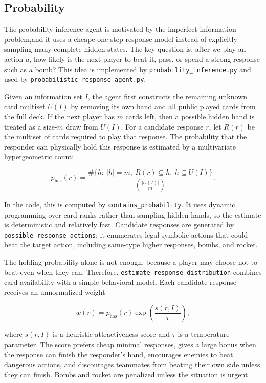 
\subsection{Probability}

The probability inference agent is motivated by the imperfect-information
problem,and it uses a cheape one-step response model instead of explicitly sampling many complete hidden states.
The key question is:
after we play an action \(a\), how likely is the next player to beat it, pass, or
spend a strong response such as a bomb? This idea is implemented by
\texttt{probability\_inference.py} and used by
\texttt{probabilistic\_response\_agent.py}.

Given an information set \(I\), the agent first constructs the remaining unknown
card multiset \(U(I)\) by removing its own hand and all public played cards from
the full deck. If the next player has \(m\) cards left, then a possible hidden
hand is treated as a size-\(m\) draw from \(U(I)\). For a candidate response
\(r\), let \(R(r)\) be the multiset of cards required to play that response. The
probability that the responder can physically hold this response is estimated by
a multivariate hypergeometric count:

\[
    p_{\mathrm{has}}(r)
    =
    \frac{
        \#\{h:\ |h|=m,\ R(r)\subseteq h,\ h\subseteq U(I)\}
    }{
        \binom{|U(I)|}{m}
    }.
\]

In the code, this is computed by \texttt{contains\_probability}. It uses dynamic
programming over card ranks rather than sampling hidden hands, so the estimate is
deterministic and relatively fast. Candidate responses are generated by
\texttt{possible\_response\_actions}: it enumerates legal symbolic actions that
could beat the target action, including same-type higher responses, bombs, and
rocket.

The holding probability alone is not enough, because a player may choose not to
beat even when they can. Therefore, \texttt{estimate\_response\_distribution}
combines card availability with a simple behavioral model. Each candidate
response receives an unnormalized weight

\[
    w(r)
    =
    p_{\mathrm{has}}(r)
    \exp\left(\frac{s(r,I)}{\tau}\right),
\]

where \(s(r,I)\) is a heuristic attractiveness score and \(\tau\) is a
temperature parameter. The score prefers cheap minimal responses, gives a large
bonus when the response can finish the responder's hand, encourages enemies to
beat dangerous actions, and discourages teammates from beating their own side
unless they can finish. Bombs and rocket are penalized unless the situation is
urgent.


